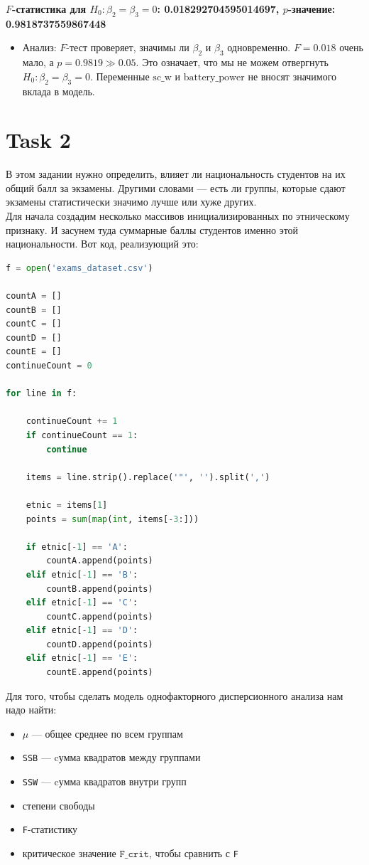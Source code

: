 \documentclass[14pt]{extreport}
\begin{document}
\textbf{\(F\)-статистика для \(H_0: \beta_2 = \beta_3 = 0\): 0.018292704595014697, \(p\)-значение: 0.9818737559867448}

\begin{itemize}
    \item Анализ: \(F\)-тест проверяет, значимы ли \(\beta_2\) и \(\beta_3\) одновременно. \(F = 0.018\) очень мало, а \(p = 0.9819 \gg 0.05\). Это означает, что мы не можем отвергнуть \(H_0: \beta_2 = \beta_3 = 0\). Переменные \(\text{sc\_w}\) и \(\text{battery\_power}\) не вносят значимого вклада в модель.
\end{itemize}


	
	\section{Task 2}
	
	В этом задании нужно определить, влияет ли национальность студентов на их общий балл за экзамены. Другими словами — есть ли группы, которые сдают экзамены статистически значимо лучше или хуже других. \\
	
	
	Для начала создадим несколько массивов инициализированных по этническому признаку. И засунем туда суммарные баллы студентов именно этой национальности. Вот код, реализующий это:
	
	\begin{lstlisting}[language=python, caption={Инициализация массивов с баллами}]
f = open('exams_dataset.csv')

countA = []
countB = []
countC = []
countD = []
countE = [] 
continueCount = 0

for line in f:

	continueCount += 1
	if continueCount == 1:
		continue
	
	items = line.strip().replace('"', '').split(',')
	
	etnic = items[1]
	points = sum(map(int, items[-3:])) 
	
	if etnic[-1] == 'A':
		countA.append(points)
	elif etnic[-1] == 'B':
		countB.append(points)
	elif etnic[-1] == 'C':
		countC.append(points)
	elif etnic[-1] == 'D':
		countD.append(points)
	elif etnic[-1] == 'E':
		countE.append(points)
\end{lstlisting}
	
	
	Для того, чтобы сделать модель однофакторного дисперсионного анализа нам надо найти:
	
	\begin{itemize}
		\item $\mu$ --- общее среднее по всем группам
		\item \texttt{SSB} --- cумма квадратов между группами
		\item \texttt{SSW} --- cумма квадратов внутри групп
		\item степени свободы
		\item \texttt{F}-статистику
		\item критическое значение $\mathtt{F\_crit}$, чтобы сравнить с \texttt{F}
	\end{itemize}
	
\end{document}
